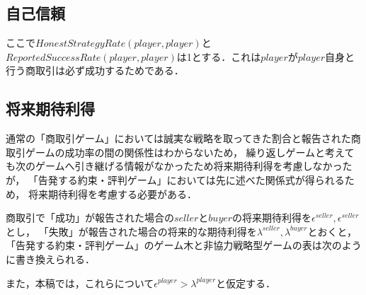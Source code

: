 \subsection{自己信頼}
ここで$ HonestStrategyRate(player, player) $と$ ReportedSuccessRate(player, player) $は1とする．これは$ player $が$ player $自身と行う商取引は必ず成功するためである．

\subsection{将来期待利得}
通常の「商取引ゲーム」においては誠実な戦略を取ってきた割合と報告された商取引ゲームの成功率の間の関係性はわからないため，
繰り返しゲームと考えても次のゲームへ引き継げる情報がなかったため将来期待利得を考慮しなかったが，
「告発する約束・評判ゲーム」においては先に述べた関係式が得られるため，
将来期待利得を考慮する必要がある．

商取引で「成功」が報告された場合の$ seller $と$ buyer $の将来期待利得を$ \epsilon^{seller}, \epsilon^{seller} $とし，
「失敗」が報告された場合の将来的な期待利得を$ \lambda^{seller}, \lambda^{buyer} $とおくと，
「告発する約束・評判ゲーム」のゲーム木と非協力戦略型ゲームの表は次のように書き換えられる．

また，本稿では，これらについて$ \epsilon^{player} > \lambda^{player} $と仮定する．

